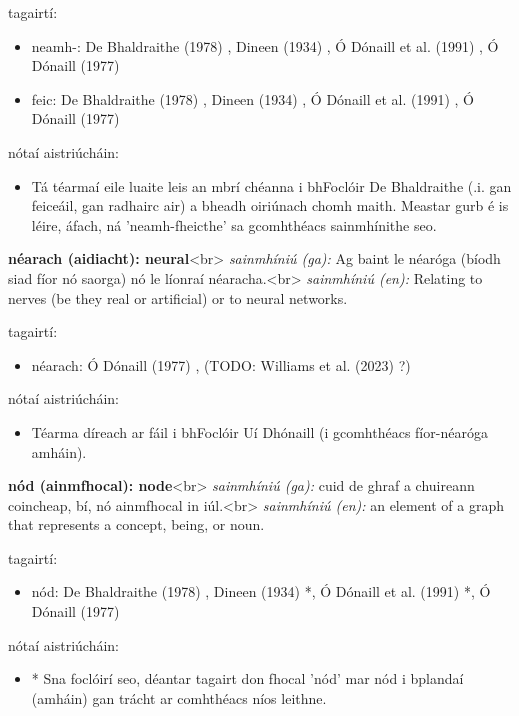 \documentclass{article}
\begin{document}
tagairtí:
\begin{itemize}
	\item neamh-: De Bhaldraithe (1978) \cite{de-bhaldraithe}, Dineen (1934) \cite{dineen}, Ó Dónaill et al. (1991) \cite{focloir-beag}, Ó Dónaill (1977) \cite{odonaill}
	\item feic: De Bhaldraithe (1978) \cite{de-bhaldraithe}, Dineen (1934) \cite{dineen}, Ó Dónaill et al. (1991) \cite{focloir-beag}, Ó Dónaill (1977) \cite{odonaill}
\end{itemize}

nótaí aistriúcháin:
\begin{itemize}
	\item Tá téarmaí eile luaite leis an mbrí chéanna i bhFoclóir De Bhaldraithe (.i. gan feiceáil, gan radhairc air) a bheadh oiriúnach chomh maith. Meastar gurb é is léire, áfach, ná 'neamh-fheicthe' sa gcomhthéacs sainmhínithe seo.
\end{itemize}


\textbf{néarach (aidiacht): neural}<br>
\textit{sainmhíniú (ga):} Ag baint le néaróga (bíodh siad fíor nó saorga) nó le líonraí néaracha.<br>
\textit{sainmhíniú (en):} Relating to nerves (be they real or artificial) or to neural networks.

tagairtí:
\begin{itemize}
	\item néarach: Ó Dónaill (1977) \cite{odonaill}, (TODO: Williams et al. (2023) \cite{storchiste}?)
\end{itemize}

nótaí aistriúcháin:
\begin{itemize}
	\item Téarma díreach ar fáil i bhFoclóir Uí Dhónaill (i gcomhthéacs fíor-néaróga amháin).
\end{itemize}


\textbf{nód (ainmfhocal): node}<br>
\textit{sainmhíniú (ga):} cuid de ghraf a chuireann coincheap, bí, nó ainmfhocal in iúl.<br>
\textit{sainmhíniú (en):} an element of a graph that represents a concept, being, or noun.

tagairtí:
\begin{itemize}
	\item nód: De Bhaldraithe (1978) \cite{de-bhaldraithe}, Dineen (1934) \cite{dineen}*, Ó Dónaill et al. (1991) \cite{focloir-beag}*, Ó Dónaill (1977) \cite{odonaill}
\end{itemize}

nótaí aistriúcháin:
\begin{itemize}
	\item * Sna foclóirí seo, déantar tagairt don fhocal 'nód' mar nód i bplandaí (amháin) gan trácht ar comhthéacs níos leithne.
\end{itemize}
\end{document}
